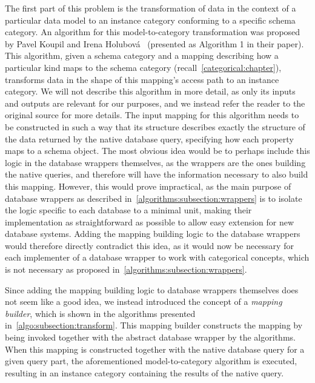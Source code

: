 The first part of this problem is the transformation of data in the context of a particular data model to an instance category conforming to a specific schema category.
An algorithm for this model-to-category transformation was proposed by Pavel Koupil and Irena Holubov{\'a}~\cite{unified_representation} (presented as Algorithm 1 in their paper).
This algorithm, given a schema category and a mapping describing how a particular kind maps to the schema category (recall~\cref{categorical:chapter}), transforms data in the shape of this mapping's access path to an instance category.
We will not describe this algorithm in more detail, as only its inputs and outputs are relevant for our purposes, and we instead refer the reader to the original source for more details.
The input mapping for this algorithm needs to be constructed in such a way that its structure describes exactly the structure of the data returned by the native database query, specifying how each property maps to a schema object.
The most obvious idea would be to perhaps include this logic in the database wrappers themselves, as the wrappers are the ones building the native queries, and therefore will have the information necessary to also build this mapping.
However, this would prove impractical, as the main purpose of database wrappers as described in~\cref{algorithms:subsection:wrappers} is to isolate the logic specific to each database to a minimal unit, making their implementation as straightforward as possible to allow easy extension for new database systems.
Adding the mapping building logic to the database wrappers would therefore directly contradict this idea, as it would now be necessary for each implementer of a database wrapper to work with categorical concepts, which is not necessary as proposed in~\cref{algorithms:subsection:wrappers}.

Since adding the mapping building logic to database wrappers themselves does not seem like a good idea, we instead introduced the concept of a \textit{mapping builder}, which is shown in the algorithms presented in~\cref{algo:subsection:transform}.
This mapping builder constructs the mapping by being invoked together with the abstract database wrapper by the algorithms.
When this mapping is constructed together with the native database query for a given query part, the aforementioned model-to-category algorithm is executed, resulting in an instance category containing the results of the native query.

